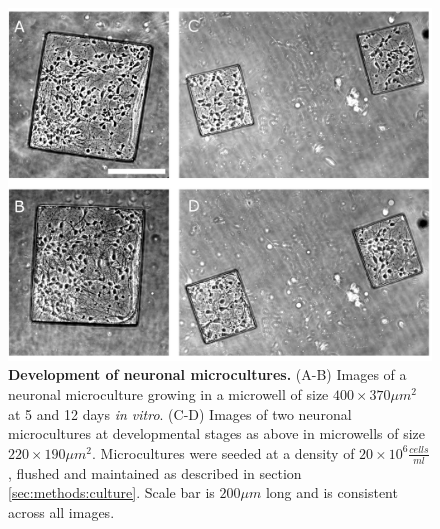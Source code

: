         \begin{figure}[h]
            \centering
            \includegraphics[width=13.7cm]{chapter4/figures/microWellsDev/microwellsDev.jpg}
            \caption[Development of neuronal microcultures]{\textbf{Development of neuronal microcultures.} (A-B) Images of a neuronal microculture growing in a microwell of size \(400\times370 \mu m^2\) at 5 and 12 days \textit{in vitro}. (C-D) Images of two neuronal microcultures at developmental stages as above in microwells of size \(220\times190 \mu m^2\). Microcultures were seeded at a density of \(20\times10^6 \frac{cells}{ml}\), flushed and maintained as described in section \ref{sec:methods:culture}. Scale bar is \(200 \mu m\) long and is consistent across all images.}
            \label{fig:devices:mwDev}
        \end{figure}


